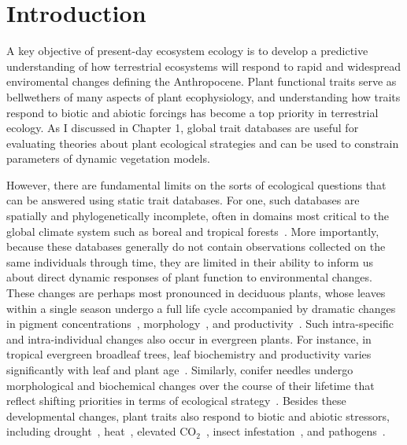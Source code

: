 \section{Introduction}

A key objective of present-day ecosystem ecology is to develop a predictive understanding of how terrestrial ecosystems will respond to rapid and widespread enviromental changes defining the Anthropocene. 
Plant functional traits serve as bellwethers of many aspects of plant ecophysiology, and understanding how traits respond to biotic and abiotic forcings has become a top priority in terrestrial ecology.
As I discussed in Chapter 1, global trait databases are useful for evaluating theories about plant ecological strategies and can be used to constrain parameters of dynamic vegetation models.

However, there are fundamental limits on the sorts of ecological questions that can be answered using static trait databases.
For one, such databases are spatially and phylogenetically incomplete, often in domains most critical to the global climate system such as boreal and tropical forests~\cite{jetz2016_diversity}.
More importantly, because these databases generally do not contain observations collected on the same individuals through time, they are limited in their ability to inform us about direct dynamic responses of plant function to environmental changes.
These changes are perhaps most pronounced in deciduous plants, whose leaves within a single season undergo a full life cycle accompanied by dramatic changes in pigment concentrations~\cite{yang_2016_seasonal}, morphology~\cite{poorter_2009_causes}, and productivity~\cite{parent_2010_modelling}.
Such intra-specific and intra-individual changes also occur in evergreen plants.
For instance, in tropical evergreen broadleaf trees, leaf biochemistry and productivity varies significantly with leaf and plant age~\cite{kitajima_1997_decline,Kitajima_2013_leaf,chavana_bryant_2016_leaf,wu_leaf_2016}.
Similarly, conifer needles undergo morphological and biochemical changes over the course of their lifetime that reflect shifting priorities in terms of ecological strategy~\cite{kuusk_2017_major}.
Besides these developmental changes, plant traits also respond to biotic and abiotic stressors, including
drought~\cite{sun_2018_reflectance,buchner_2017_drought,bayat_2016_remote},
heat~\cite{chapin_1996_physiological,serbin_2012_spectroscopic},
elevated CO$_2$~\cite{medlyn_using_2015,lindroth_2010_impacts},
insect infestation~\cite{divittorio_2009_spectral,marti_2012_metabolomics},
and pathogens~\cite{horst_2009_ustilago}.

